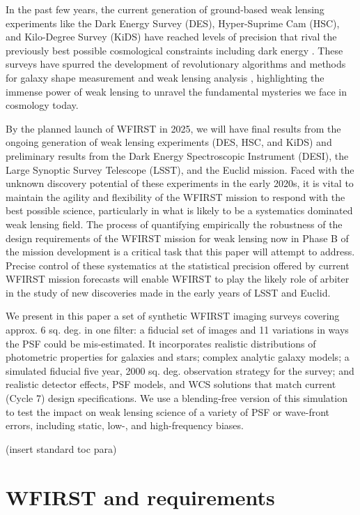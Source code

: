 \documentclass[aps,prd, amsmath,amssymb,superscriptaddress,showkeys,nofootinbib,reprint,preprintnumbers]{revtex4-1}
\newcommand\assign[1]{\todo[color=RoyalPurple!40, inline, size=\small]{Contributing: #1}}
\begin{document}
In the past few years, the current generation of ground-based weak lensing experiments like the Dark Energy Survey (DES), Hyper-Suprime Cam (HSC), and Kilo-Degree Survey (KiDS) have reached levels of precision that rival the previously best possible cosmological constraints including dark energy \cite{}. 
These surveys have spurred the development of revolutionary algorithms and methods for galaxy shape measurement and weak lensing analysis \cite{}, highlighting the immense power of weak lensing to unravel the fundamental mysteries we face in cosmology today. 

By the planned launch of WFIRST in 2025, we will have final results from the ongoing generation of weak lensing experiments (DES, HSC, and KiDS) and preliminary results from the Dark Energy Spectroscopic Instrument (DESI), the Large Synoptic Survey Telescope (LSST), and the Euclid mission. 
Faced with the unknown discovery potential of these experiments in the early 2020s, it is vital to maintain the agility and flexibility of the WFIRST mission to respond with the best possible science, particularly in what is likely to be a systematics dominated weak lensing field.
The process of quantifying empirically the robustness of the design requirements of the WFIRST mission for weak lensing now in Phase B of the mission development is a critical task that this paper will attempt to address. 
Precise control of these systematics at the statistical precision offered by current WFIRST mission forecasts will enable WFIRST to play the likely role of arbiter in the study of new discoveries made in the early years of LSST and Euclid.

We present in this paper a set of synthetic WFIRST imaging surveys covering approx. 6 sq. deg. in one filter: a fiducial set of images and 11 variations in ways the PSF could be mis-estimated. 
It incorporates realistic distributions of photometric properties for galaxies and stars; complex analytic galaxy models; a simulated fiducial five year, 2000 sq. deg. observation strategy for the survey; and realistic detector effects, PSF models, and WCS solutions that match current (Cycle 7) design specifications. 
We use a blending-free version of this simulation to test the impact on weak lensing science of a variety of PSF or wave-front errors, including static, low-, and high-frequency biases. 

(insert standard toc para) 


\section{WFIRST and requirements}\label{sec:wfirst}
\assign{Hirata}
\end{document}
